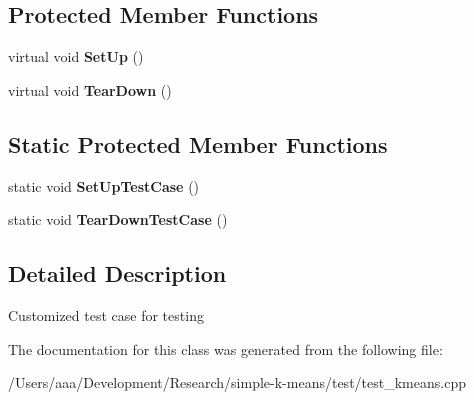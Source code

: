 \subsection*{Protected Member Functions}
\begin{DoxyCompactItemize}
\item 
\hypertarget{classKmeansTest_a342e848abba368f87b25a0e8c8a511d7}{virtual void {\bfseries Set\+Up} ()}\label{classKmeansTest_a342e848abba368f87b25a0e8c8a511d7}

\item 
\hypertarget{classKmeansTest_a16de3306d32ab3ece3766800ab01fae1}{virtual void {\bfseries Tear\+Down} ()}\label{classKmeansTest_a16de3306d32ab3ece3766800ab01fae1}

\end{DoxyCompactItemize}
\subsection*{Static Protected Member Functions}
\begin{DoxyCompactItemize}
\item 
\hypertarget{classKmeansTest_a5374fc1586536e197b55fd620b3bb2cb}{static void {\bfseries Set\+Up\+Test\+Case} ()}\label{classKmeansTest_a5374fc1586536e197b55fd620b3bb2cb}

\item 
\hypertarget{classKmeansTest_a4e7430b8838dcfbd3f1dab67abd0e466}{static void {\bfseries Tear\+Down\+Test\+Case} ()}\label{classKmeansTest_a4e7430b8838dcfbd3f1dab67abd0e466}

\end{DoxyCompactItemize}


\subsection{Detailed Description}
Customized test case for testing 

The documentation for this class was generated from the following file\+:\begin{DoxyCompactItemize}
\item 
/\+Users/aaa/\+Development/\+Research/simple-\/k-\/means/test/test\+\_\+kmeans.\+cpp\end{DoxyCompactItemize}
